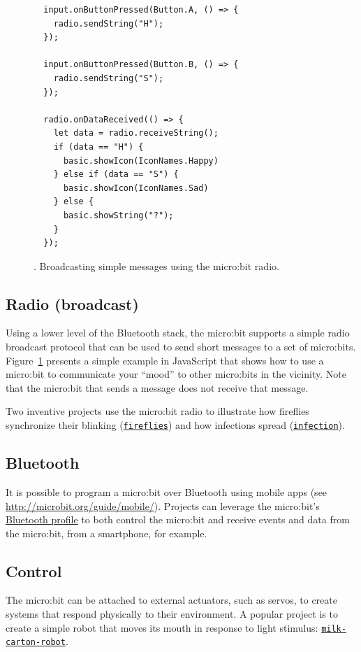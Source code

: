 \begin{figure}[t]
\begin{verbatim}
  input.onButtonPressed(Button.A, () => {
    radio.sendString("H");
  });

  input.onButtonPressed(Button.B, () => {
    radio.sendString("S");
  });

  radio.onDataReceived(() => {
    let data = radio.receiveString();
    if (data == "H") {
      basic.showIcon(IconNames.Happy)
    } else if (data == "S") {
      basic.showIcon(IconNames.Sad)
    } else {
      basic.showString("?");
    }
  });
\end{verbatim}
\caption{\label{fig:mood}. Broadcasting simple messages using the micro:bit radio.}
\end{figure}

\subsection{Radio (broadcast)}

Using a lower level of the Bluetooth stack, the micro:bit supports 
a simple radio broadcast protocol that can be used to send short messages
to a set of micro:bits. Figure~\ref{fig:mood} presents a simple example 
in JavaScript that shows how to use a micro:bit to communicate your 
``mood'' to other micro:bits in the vicinity.
Note that the micro:bit that sends a message does not
receive that message. 

Two inventive projects use the micro:bit radio to illustrate
how fireflies synchronize their blinking 
({\tt \href{http://makecode.microbit.org/projects/fireflies}{fireflies}}) 
and how infections spread
({\tt \href{http://makecode.microbit.org/projects/infection}{infection}}).

\subsection{Bluetooth}

It is possible to program a micro:bit over Bluetooth using mobile apps
(see \url{http://microbit.org/guide/mobile/}). 
Projects can leverage the micro:bit's 
\href{https://lancaster-university.github.io/microbit-docs/ble/profile/}{Bluetooth profile} to 
both control the micro:bit and receive events and data
from the micro:bit, from a smartphone, for example.  

\subsection{Control}

The micro:bit can be attached to external actuators, such as servos,
to create systems that respond physically to their environment. A popular
project is to create a simple robot that moves its mouth in response to light
stimulus: {\tt \href{http://makecode.microbit.org/projects/milk-carton-robot}{milk-carton-robot}}.

